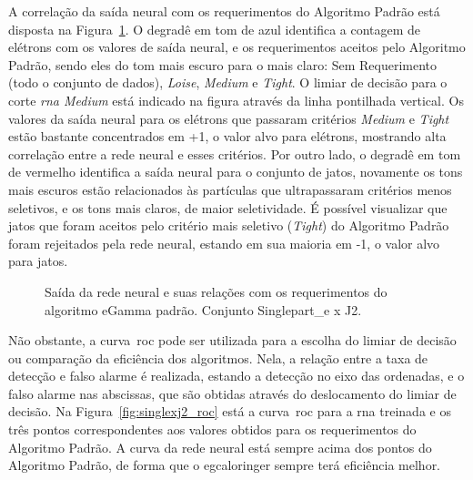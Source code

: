 A correlação da saída neural com os requerimentos do Algoritmo Padrão está
disposta na Figura~\ref{fig:singlexj2_saidaneural}. O degradê em tom de azul
identifica a contagem de elétrons com os valores de saída neural, e os
requerimentos aceitos pelo Algoritmo Padrão, sendo eles do tom mais escuro para
o mais claro: Sem Requerimento (todo o conjunto de dados), \emph{Loise},
\emph{Medium} e \emph{Tight}. O limiar de decisão para o corte \emph{\gls{rna}
Medium} está indicado na figura através da linha pontilhada vertical. Os valores
da saída neural para os elétrons que passaram critérios \emph{Medium} e
\emph{Tight} estão bastante concentrados em +1, o valor alvo para elétrons,
mostrando alta correlação entre a rede neural e esses critérios. Por outro lado,
o degradê em tom de vermelho identifica a saída neural para o conjunto de jatos,
novamente os tons mais escuros estão relacionados às partículas que
ultrapassaram critérios menos seletivos, e os tons mais claros, de maior
seletividade. É possível visualizar que jatos que foram aceitos pelo critério
mais seletivo (\emph{Tight}) do Algoritmo Padrão foram rejeitados pela rede neural, 
estando em sua maioria em -1, o valor alvo para jatos.

\begin{figure}[htb]
\centering
{}
\caption{Saída da rede neural e suas relações com os requerimentos do algoritmo
eGamma padrão. Conjunto Singlepart\_e x J2.}
\label{fig:singlexj2_saidaneural}
\end{figure}

Não obstante, a curva~\gls{roc} pode ser utilizada para a escolha do limiar de
decisão ou comparação da eficiência dos algoritmos. Nela, a relação entre a taxa
de detecção e falso alarme é realizada, estando a detecção no eixo das
ordenadas, e o falso alarme nas abscissas, que são obtidas através do
deslocamento do limiar de decisão. Na Figura~\ref{fig:singlexj2_roc} está a
curva~\gls{roc} para a \gls{rna} treinada e os três pontos correspondentes aos
valores obtidos para os requerimentos do Algoritmo Padrão. A curva da rede
neural está sempre acima dos pontos do Algoritmo Padrão, de forma que o
\gls{egcaloringer} sempre terá eficiência melhor.

